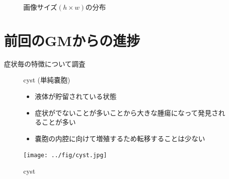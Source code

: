 \documentclass[a4j]{ujarticle}
\begin{document}
\begin{itemize}
\begin{figure}[ht]
\begin{minipage}{.39\textwidth}
					\caption{画像サイズ$(h \times w)$の分布}
					\label{fig:ratio}
				\end{minipage}
			\end{figure}
		\end{itemize}

\clearpage

	\section{前回のGMからの進捗}
		\begin{itemize}
			\item 症状毎の特徴について調査
						\end{minipage}
						\begin{minipage}{.09\linewidth}
							\texttt{[image: ../fig/cyst.jpg]} \caption{cyst} \label{fig:cyst}
						\end{minipage}
					\end{figure}

\end{itemize}
\end{itemize}
\end{document}

